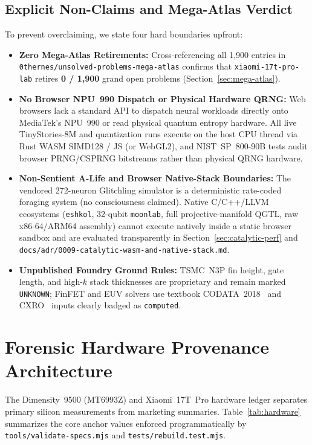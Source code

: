 \documentclass[11pt,a4paper]{amsart}
\newcommand{\code}[1]{{\small\nolinkurl{#1}}}
\theoremstyle{remark}
\begin{document}
\subsection{Explicit Non-Claims and Mega-Atlas Verdict}
To prevent overclaiming, we state four hard boundaries upfront:
\begin{itemize}
  \item \textbf{Zero Mega-Atlas Retirements:} Cross-referencing all 1,900
  entries in \code{0thernes/unsolved-problems-mega-atlas} confirms that
  \code{xiaomi-17t-pro-lab} retires \textbf{0 / 1,900} grand open problems
  (Section~\ref{sec:mega-atlas}).
  \item \textbf{No Browser NPU~990 Dispatch or Physical Hardware QRNG:} Web
  browsers lack a standard API to dispatch neural workloads directly onto
  MediaTek's NPU~990 or read physical quantum entropy hardware. All live
  TinyStories-8M and quantization runs execute on the host CPU thread via Rust
  WASM SIMD128 / JS (or WebGL2), and NIST~SP~800-90B tests audit browser
  PRNG/CSPRNG bitstreams rather than physical QRNG hardware.
  \item \textbf{Non-Sentient A-Life and Browser Native-Stack Boundaries:} The
  vendored 272-neuron Glitchling simulator is a deterministic rate-coded
  foraging system (no consciousness claimed). Native C/C++/LLVM ecosystems
  (\code{eshkol}, 32-qubit \code{moonlab}, full projective-manifold QGTL, raw
  x86-64/ARM64 assembly) cannot execute natively inside a static browser sandbox
  and are evaluated transparently in Section~\ref{sec:catalytic-perf} and
  \code{docs/adr/0009-catalytic-wasm-and-native-stack.md}.
  \item \textbf{Unpublished Foundry Ground Rules:} TSMC~N3P fin height, gate
  length, and high-$k$ stack thicknesses are proprietary and remain marked
  \code{UNKNOWN}; FinFET and EUV solvers use textbook CODATA~2018~\cite{tiesinga2021codata}
  and CXRO~\cite{henke1993xray} inputs clearly badged as \code{computed}.
\end{itemize}

\section{Forensic Hardware Provenance Architecture}

The Dimensity~9500 (MT6993Z) and Xiaomi~17T~Pro hardware ledger separates
primary silicon measurements from marketing summaries. Table~\ref{tab:hardware}
summarizes the core anchor values enforced programmatically by
\code{tools/validate-specs.mjs} and \code{tests/rebuild.test.mjs}.
\end{document}
